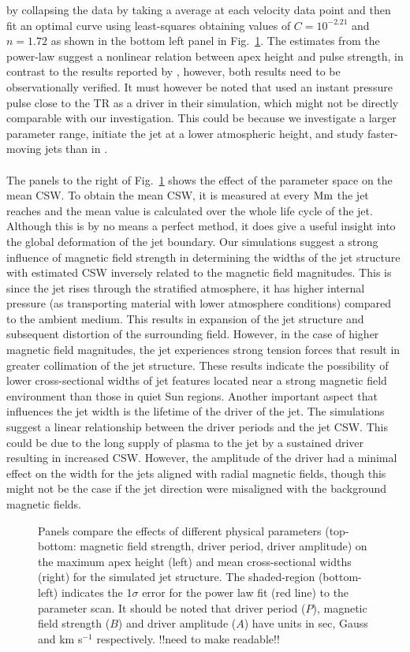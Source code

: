 \documentclass[12pt]{ociamthesis}
\newcommand{\np}{\\ \\}
\begin{document}
by collapsing the data by taking a average at each velocity data point and then fit an optimal curve using least-squares obtaining values of $C= 10^{-2.21}$ and $n= 1.72$ as shown in the bottom left panel in Fig.~\ref{parameter_scan_lines}. The estimates from the power-law suggest a nonlinear relation between apex height and pulse strength, in contrast to the results reported by \citet{Singh2019}, however, both results need to be observationally verified. It must however be noted that \citet{Singh2019} used an instant pressure pulse close to the TR as a driver in their simulation, which might not be directly comparable with our investigation. This could be because we investigate a larger parameter range, initiate the jet at a lower atmospheric height, and study faster-moving jets than in \citet{Singh2019}. \np 
%
The panels to the right of Fig.~\ref{parameter_scan_lines} shows the effect of the parameter space on the mean CSW. To obtain the mean CSW, it is measured at every $\rm{Mm}$ the jet reaches and the mean value is calculated over the whole life cycle of the jet. Although this is by no means a perfect method, it does give a useful insight into the global deformation of the jet boundary. Our simulations suggest a strong influence of magnetic field strength in determining the widths of the jet structure with estimated CSW inversely related to the magnetic field magnitudes. This is since the jet rises through the stratified atmosphere, it has higher internal pressure (as transporting material with lower atmosphere conditions) compared to the ambient medium. This results in expansion of the jet structure and subsequent distortion of the surrounding field. However, in the case of higher magnetic field magnitudes, the jet experiences strong tension forces that result in greater collimation of the jet structure. These results indicate the possibility of lower cross-sectional widths of jet features located near a strong magnetic field environment than those in quiet Sun regions. Another important aspect that influences the jet width is the lifetime of the driver of the jet. The simulations suggest a linear relationship between the driver periods and the jet CSW. This could be due to the long supply of plasma to the jet by a sustained driver resulting in increased CSW. However, the amplitude of the driver had a minimal effect on the width for the jets aligned with radial magnetic fields, though this might not be the case if the jet direction were misaligned with the background magnetic fields.
\begin{figure}
\captionsetup[subfigure]{labelformat=empty}
\centering
{}
\caption{Panels compare the effects of different physical parameters (top-bottom: magnetic field strength, driver period, driver amplitude) on the maximum apex height (left) and mean cross-sectional widths (right) for the simulated jet structure. The shaded-region (bottom-left) indicates the 1$\sigma$ error for the power law fit (red line) to the parameter scan. It should be noted that driver period ($P$), magnetic field strength ($B$) and driver amplitude ($A$) have units in sec, Gauss and km s$^{-1}$ respectively. {\color{green}!!need to make readable!!}}
\label{parameter_scan_lines}
\end{figure}
\end{document}
